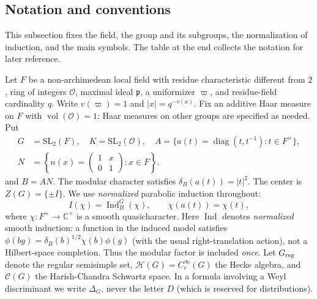 \documentclass[12pt,letterpaper]{amsart}
\numberwithin{equation}{section}
\theoremstyle{definition}
\theoremstyle{remark}
\newcommand{\calH}{\mathcal H}
\newcommand{\calC}{\mathcal C}
\newcommand{\vol}{\operatorname{vol}}
\newcommand{\Ind}{\operatorname{Ind}}
\newcommand{\diag}{\operatorname{diag}}
\begin{document}
\subsection{Notation and conventions}\label{sec:notation}
This subsection fixes the field, the group and its subgroups, the normalization of induction, and the main symbols. The table at the end collects the notation for later reference.

Let $F$ be a non-archimedean local field with residue characteristic different from $2$, ring of integers $\mathcal O$, maximal ideal $\mathfrak p$, a uniformizer $\varpi$, and residue-field cardinality $q$.  Write $v(\varpi)=1$ and $|x|=q^{-v(x)}$.  Fix an additive Haar measure on $F$ with $\vol(\mathcal O)=1$; Haar measures on other groups are specified as needed. Put
\[
\begin{aligned}
G&=\mathrm{SL}_2(F),\quad K=\mathrm{SL}_2(\mathcal O),\quad
A=\{a(t)=\diag(t,t^{-1}):t\in F^\times\},\\
N&=\left\{n(x)=\begin{pmatrix}1&x\\0&1\end{pmatrix}:x\in F\right\}.
\end{aligned}
\]
and $B=AN$.  The modular character satisfies $\delta_B(a(t))=|t|^2$.  The center is $Z(G)=\{\pm I\}$. We use \emph{normalized} parabolic induction throughout:
\begin{equation}\label{eq:induction}
I(\chi)=\Ind_B^G(\chi),\qquad
\chi(a(t))=\chi(t),
\end{equation}
where $\chi:F^\times\to\mathbb C^\times$ is a smooth quasicharacter. Here $\Ind$ denotes \emph{normalized} smooth induction: a function in the induced model satisfies $\phi(bg)=\delta_B(b)^{1/2}\chi(b)\phi(g)$ (with the usual right-translation action), not a Hilbert-space completion. Thus the modular factor is included \emph{once}. Let $G_{\rm reg}$ denote the regular semisimple set, $\calH(G)=C_c^\infty(G)$ the Hecke algebra, and $\calC(G)$ the Harish-Chandra Schwartz space.  In a formula involving a Weyl discriminant we write $\Delta_G$, never the letter $D$ (which is reserved for distributions).
\end{document}
